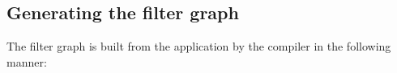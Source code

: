 \subsection{Generating the filter graph}
\label{sec:build-appl-graph}


The filter graph is built from the application by the compiler %
in the
following manner:

